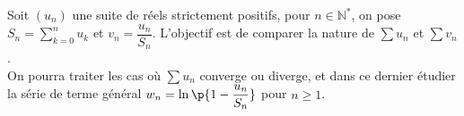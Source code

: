 Soit $(u_n)$ une suite de réels strictement positifs, pour $n\in\mathbb N^*$,
on pose $S_n=\displaystyle\sum_{k=0}^n u_k$ et $v_n=\dfrac{u_n}{S_n}$.
L'objectif est de comparer la nature de $\displaystyle\sum u_n$ et
$\displaystyle\sum v_n$.\\
On pourra traiter les cas où $\displaystyle\sum u_n$ converge ou diverge,
et dans ce dernier étudier la série de terme général $w_n=\ln\p{1-\dfrac{u_n}{S_n}}$
pour $n\geqslant1$.
